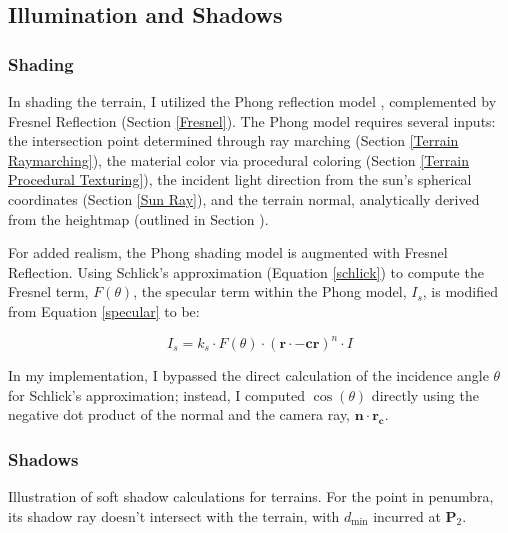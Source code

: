\subsection{Illumination and Shadows}

\subsubsection{Shading}
\label{Terrain Shading}

In shading the terrain, I utilized the Phong reflection model \cite{phong_illumination_1975}, complemented by Fresnel Reflection (Section \ref{Fresnel}). The Phong model requires several inputs: the intersection point determined through ray marching (Section \ref{Terrain Raymarching}), the material color via procedural coloring (Section \ref{Terrain Procedural Texturing}), the incident light direction from the sun's spherical coordinates (Section \ref{Sun Ray}), and the terrain normal, analytically derived from the heightmap (outlined in Section ).


For added realism, the Phong shading model is augmented with Fresnel Reflection. Using Schlick's approximation (Equation \ref{schlick}) to compute the Fresnel term, $F(\theta)$, the specular term within the Phong model, $I_s$, is modified from Equation \ref{specular} to be:

\begin{equation}
I_{s} = k_s \cdot F(\theta) \cdot (\mathbf{r} \cdot \mathbf{-cr})^n \cdot I
\end{equation}

In my implementation, I bypassed the direct calculation of the incidence angle $\theta$ for Schlick's approximation; instead, I computed $\cos(\theta)$ directly using the negative dot product of the normal and the camera ray, $\mathbf{n} \cdot \mathbf{r_c}$.

\subsubsection{Shadows}
\label{Terrain Shadows}

{Illustration of soft shadow calculations for terrains. For the point in penumbra, its shadow ray doesn't intersect with the terrain, with $d_{\text{min}}$ incurred at $\mathbf{P}_2$.}{}

